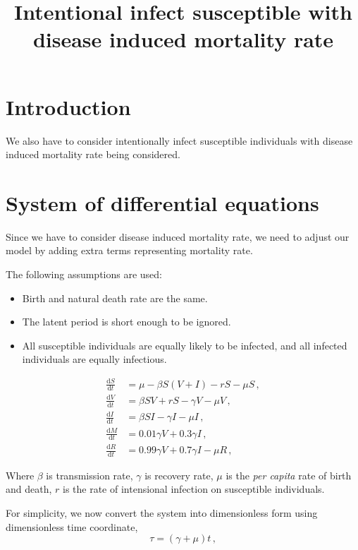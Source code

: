 \documentclass[12pt]{article}
\title{Intentional infect susceptible with disease induced mortality rate}
\newcommand\dbyd[2]{\frac{\mathrm d{#1}}{\mathrm d{#2}}}
\begin{document}
\linenumbers
\maketitle

\section{Introduction}

We also have to consider intentionally infect susceptible individuals with disease induced mortality rate being considered.

\section{System of differential equations}

Since we have to consider disease induced mortality rate, we need to adjust our model by adding extra terms representing mortality rate.

The following assumptions are used:

\begin{itemize}
\item Birth and natural death rate are the same.
\item The latent period is short enough to be ignored.
\item All susceptible individuals are equally likely to be infected, and all infected individuals are equally infectious.
\end{itemize}

\begin{equation}\label{1}
\begin{split}
\dbyd{S}{t}&=\mu- \beta S(V+I)-rS-\mu S \,,\\
\dbyd{V}{t}&=\beta SV+rS-\gamma V -\mu V\,,\\
\dbyd{I}{t}&=\beta SI-\gamma I -\mu I\,,\\
\dbyd{M}{t}&=0.01\gamma V+0.3\gamma I\,,\\
\dbyd{R}{t}&=0.99\gamma V+0.7\gamma I-\mu R\,,
\end{split}
\end{equation}

Where $\beta$ is transmission rate, $\gamma$ is recovery rate, $\mu$ is the \emph{per capita} rate of birth and death, $r$ is the rate of intensional infection on susceptible individuals.

For simplicity, we now convert the system into dimensionless form using dimensionless time coordinate,
\begin{equation}
\tau=(\gamma+\mu)t \,,
\end{equation}
\end{document}
